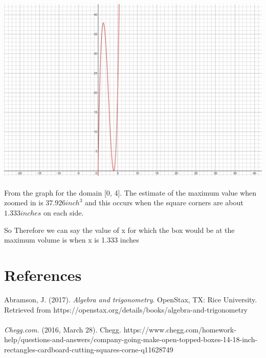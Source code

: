 \documentclass{article}
\begin{document}
\includegraphics[scale = 0.1]{poly}\\
\\From the graph for the domain [0, 4]. The estimate of the maximum value when zoomed in is ${37.926 inch^3}$ and this occurs when the square corners are about ${1.333 inches}$ on each side.

So Therefore we can say the value of x for which the box would be at the maximum volume is when x is 1.333 inches





\section*{References}
Abramson, J. (2017). \textit{Algebra and trigonometry}. OpenStax, TX: Rice University. Retrieved
from https://openstax.org/details/books/algebra-and-trigonometry\\
\\\textit{Chegg.com.} (2016, March 28). Chegg. https://www.chegg.com/homework-help/questions-and-answers/company-going-make-open-topped-boxes-14-18-inch-rectangles-cardboard-cutting-squares-corne-q11628749
\end{document}
